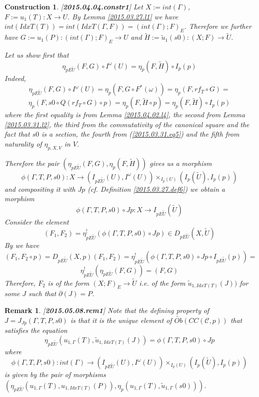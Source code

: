 \documentclass[12pt]{article}
\newtheorem{remark}[proposition]{Remark}
\newtheorem{construction}[proposition]{Construction}
\newcommand{\llabel}[1]{\label{#1}[{\bf #1}]}
\newcommand{\sr}{\rightarrow}
\newcommand{\wt}{\widetilde}
\begin{document}
\begin{construction}\rm
\llabel{2015.04.04.constr1}
Let $X:=int(\Gamma)$, $F:=u_1(T):X\sr U$. By Lemma \ref{2015.03.27.l1} we have $int(IdxT(T))=int(IdxT(\Gamma,F))=(int(\Gamma);F)_{E}$. Therefore we further have
$G:=u_1(P):(int(\Gamma);F)_{E}\sr U$ and $\wt{H}:=\wt{u}_1(s0):(X;F)\sr \wt{U}$. 

Let us show first that
%
$$\eta_{pE\wt{U}}(F,G)\circ I^{\omega}(U)=\eta_p(F,\wt{H})\circ I_p(p)$$
%
Indeed,
%
$$\eta_{pE\wt{U}}(F,G)\circ I^{\omega}(U)=\eta_p(F,G\circ F^*(\omega))=\eta_p(F,rf_T\circ G)=$$
$$\eta_p(F,s0\circ Q(rf_T\circ G)\circ p)=\eta_p(F,\wt{H}\circ p)=\eta_p(F,\wt{H})\circ I_p(p)$$
%
where the first equality is from Lemma \ref{2015.04.02.l4}, the second from Lemma \ref{2015.03.31.l2}, the third from the commutativity of the canonical square and the fact that $s0$ is a section, the fourth from (\ref{2015.03.31.eq5}) and the fifth from naturality of $\eta_{p,X,V}$ in $V$. 

Therefore the pair $(\eta_{pE\wt{U}}(F,G),\eta_p(F,\wt{H}))$ gives us a morphism
%
$$\phi(\Gamma,T,P,s0):X\sr (I_{pE\wt{U}}(U), I^{\omega}(U)) \times_{I_p(U)} (I_p(\wt{U}),I_p(p))$$
%
and compositing it with $Jp$ (cf. Definition \ref{2015.03.27.def6}) we obtain a morphism 
%
$$\phi(\Gamma,T,P,s0)\circ Jp: X\sr I_{pE\wt{U}}(\wt{U})$$
%
Consider the element 
%
$$(F_1,F_2)=\eta^!_{pE\wt{U}}(\phi(\Gamma,T,P,s0)\circ Jp)\in D_{pE\wt{U}}(X,\wt{U})$$
By \cite[Problem 3.8(1)]{fromunivwithPi} we have 
%
$$(F_1,F_2\circ p)=D_{pE\wt{U}}(X,p)(F_1,F_2)=\eta^!_{pE\wt{U}}(\phi(\Gamma,T,P,s0)\circ Jp\circ I_{pE\wt{U}}(p))=$$
%
$$\eta^!_{pE\wt{U}}(\eta_{pE\wt{U}}(F,G))=(F,G)$$
%
Therefore, $F_2$ is of the form $(X;F)_E\sr \wt{U}$ i.e. of the form $\wt{u}_{1,IdxT(T)}(J))$ for some $J$ such that $\partial(J)=P$. 
\end{construction}
%
\begin{remark}\rm
\llabel{2015.05.08.rem1}
Note that the defining property of $J=J_{Jp}(\Gamma,T,P,s0)$ is that it is the unique element of $\wt{Ob}(CC({\mathcal C},p))$ that satisfies the equation
%
$$\eta_{pE\wt{U}}(u_{1,\Gamma}(T),\wt{u}_{1,IdxT(T)}(J))=\phi(\Gamma,T,P,s0)\circ Jp$$
%
where 
%
$$\phi(\Gamma,T,P,s0):int(\Gamma)\sr (I_{pE\wt{U}}(U),I^{\omega}(U))\times_{I_p(U)}(I_p(\wt{U}),I_p(p))$$
%
is given by the pair of morphisms $(\eta_{pE\wt{U}}(u_{1,\Gamma}(T), u_{1,IdxT(T)}(P)), \eta_p(u_{1,\Gamma}(T),\wt{u}_{1,\Gamma}(s0)))$.
\end{remark}
%
\end{document}
